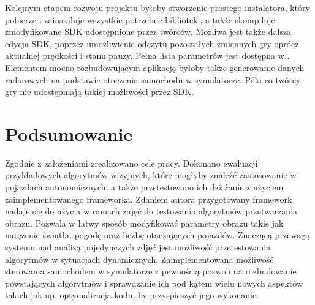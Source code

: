 Kolejnym etapem rozwoju projektu byłoby stworzenie prostego instalatora, który pobierze i zainstaluje wszystkie potrzebne biblioteki, a także skompiluje zmodyfikowane SDK udostępnione przez twórców. Możliwa jest także dalsza edycja SDK, poprzez umożliwienie odczytu pozostałych zmiennych gry oprócz aktualnej prędkości i stanu pauzy. Pełna lista parametrów jest dostępna w \cite{S3}. Elementem mocno rozbudowującym aplikację byłoby także generowanie danych radarowych na podstawie otoczenia samochodu w symulatorze. Póki co twórcy gry nie udostępniają takiej możliwości przez SDK.


\chapter{Podsumowanie}
Zgodnie z założeniami zrealizowano cele pracy. Dokonano ewaluacji przykładowych algorytmów wizyjnych, które mogłyby znaleźć zastosowanie w pojazdach autonomicznych, a także przetestowano ich działanie z użyciem zaimplementowanego frameworka. Zdaniem autora przygotowany framework nadaje się do użycia w ramach zajęć do testowania algorytmów przetwarzania obrazu. Pozwala w łatwy sposób modyfikować parametry obrazu takie jak natężenie światła, pogodę oraz liczbę otaczających pojazdów. Znaczącą przewagą systemu nad analizą pojedynczych zdjęć jest możliwość przetestowania algorytmów w sytuacjach dynamicznych. Zaimplementowana możliwość sterowania samochodem w symulatorze z pewnością pozwoli na rozbudowanie powstających algorytmów i sprawdzanie ich pod kątem wielu nowych aspektów takich jak np. optymalizacja kodu, by przyspieszyć jego wykonanie.

